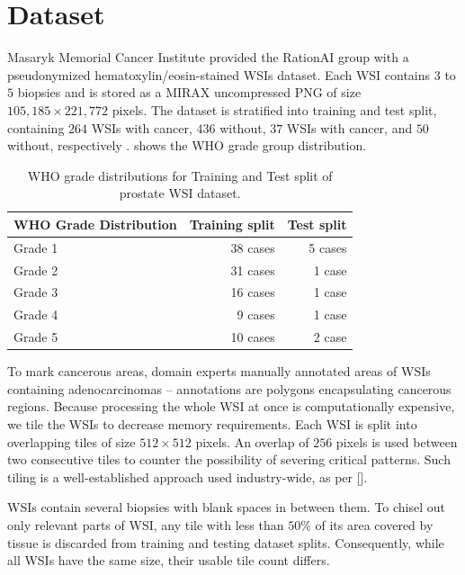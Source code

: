 \section{Dataset}\label{sec:dataset}
Masaryk Memorial Cancer Institute provided the RationAI group with a pseudonymized hematoxylin/eosin-stained WSIs dataset.
Each WSI contains $3$ to $5$ biopsies and is stored as a MIRAX uncompressed PNG of size $105,185 \times 221,772$ pixels.
The dataset is stratified into training and test split, containing $264$ WSIs with cancer, $436$ without, $37$ WSIs with cancer, and $50$ without, respectively \cite{gallo}.
 shows the WHO grade group distribution.
\begin{table}
\centering
{}
\begin{tabular}{@{} l r r @{}}\toprule
WHO Grade Distribution & Training split & Test split \\ 
\midrule
Grade 1         & 38 cases            & 5 cases      \\
Grade 2         & 31 cases            & 1 case       \\
Grade 3         & 16 cases            & 1 case       \\
Grade 4         & 9 cases             & 1 case       \\
Grade 5         & 10 cases            & 2 case       \\
\bottomrule
\end{tabular}
\caption{WHO grade distributions for Training and Test split of prostate WSI dataset.}
\label{tab:who_grade_distribution}
\end{table}

To mark cancerous areas, domain experts manually annotated areas of WSIs containing adenocarcinomas -- annotations are polygons encapsulating cancerous regions.
Because processing the whole WSI at once is computationally expensive, we tile the WSIs to decrease memory requirements.
Each WSI is split into overlapping tiles of size $512 \times 512$ pixels.
An overlap of $256$ pixels is used between two consecutive tiles to counter the possibility of severing critical patterns.
Such tiling is a well-established approach used industry-wide, as per [].

WSIs contain several biopsies with blank spaces in between them.
To chisel out only relevant parts of WSI, any tile with less than $50$\% of its area covered by tissue is discarded from training and testing dataset splits.
Consequently, while all WSIs have the same size, their usable tile count differs.

